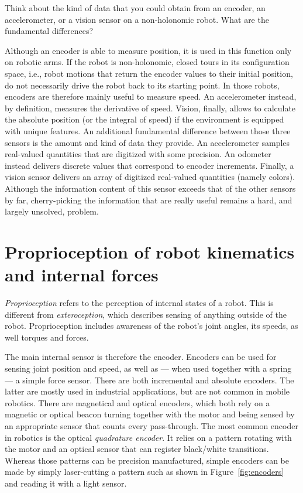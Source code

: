 \begin{mdframed}
Think about the kind of data that you could obtain from an encoder, an accelerometer, or a vision sensor on a non-holonomic robot. What are the fundamental differences?
\end{mdframed}
Although an encoder is able to measure position, it is used in this function only on robotic arms. If the robot is non-holonomic, closed tours in its configuration space, i.e., robot motions that return the encoder values to their initial position, do not necessarily drive the robot back to its starting point. In those robots, encoders are therefore mainly useful to measure speed. An accelerometer instead, by definition, measures the derivative of speed. Vision, finally, allows to calculate the absolute position (or the integral of speed) if the environment is equipped with unique features. An additional fundamental difference between those three sensors is the amount and kind of data they provide. An accelerometer samples real-valued quantities that are digitized with some precision. An odometer instead delivers discrete values that correspond to encoder increments. Finally, a vision sensor delivers an array of digitized real-valued quantities (namely colors). Although the information content of this sensor exceeds that of the other sensors by far, cherry-picking the information that are really useful remains a hard, and largely unsolved, problem.


\section{Proprioception of robot kinematics and internal forces}\label{sec:sensors:encoders}
\emph{Proprioception}  refers to the perception of internal states of a robot.
This is different from \emph{exteroception}, which describes sensing of anything outside of the robot. Proprioception includes awareness of the robot's joint angles, its speeds, as well torques and forces.

The main internal sensor is therefore the encoder. Encoders can be used for sensing joint position and speed, as well as --- when used together with a spring --- a simple force sensor. There are both incremental and absolute encoders. The latter are mostly used in industrial applications, but are not common in mobile robotics. There are magnetical and optical encoders, which both rely on a magnetic or optical beacon turning together with the motor and being sensed by an appropriate sensor that counts every pass-through. The most common encoder in robotics is the optical \emph{quadrature encoder}.  It relies on a pattern rotating with the motor and an optical sensor that can register black/white transitions. Whereas those patterns can be precision manufactured, simple encoders can be made by simply laser-cutting a pattern such as shown in Figure~\ref{fig:encoders} and reading it with a light sensor.

